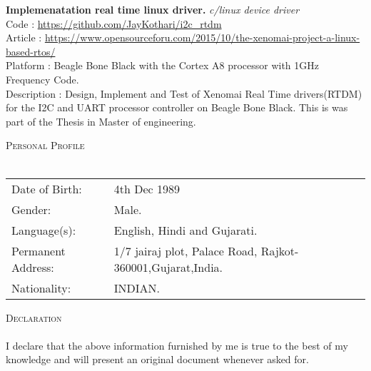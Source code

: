\documentclass[a4paper]{article}
\newcommand{\lineunder} {
    \vspace*{-8pt} \\
    \hspace*{-18pt} \hrulefill \\
}
\newcommand{\header} [1] {
    {\hspace*{-18pt}\vspace*{6pt} \textsc{#1}}
    \vspace*{-6pt} \lineunder
}
\begin{document}
{\textbf{Implemenatation real time linux driver.}} {\sl c/linux device driver} \hfill \\ 
Code : \url{https://github.com/JayKothari/i2c\_rtdm} \\ 
Article : \url{https://www.opensourceforu.com/2015/10/the-xenomai-project-a-linux-based-rtos/}\\
\vspace*{1mm}
Platform : Beagle Bone Black with the Cortex A8 processor with 1GHz Frequency Code.\\
Description : Design, Implement and Test of Xenomai Real Time drivers(RTDM) for the I2C and UART processor controller on Beagle Bone Black. This is was part of the Thesis in Master of engineering.\\
\vspace*{2mm}

\header{Personal Profile}
\begin{tabular}{ l l }
	Date of Birth:        & 4th Dec 1989                                  \\
	Gender:              & Male.                            				\\
	Language(s):           & English, Hindi and Gujarati. 					\\
	Permanent Address: & 1/7 jairaj plot, Palace Road, Rajkot-360001,Gujarat,India.     \\
	Nationality:            & INDIAN.                             			\\
\end{tabular}
\vspace*{2mm}

\header{Declaration}
I declare that the above information furnished by me is true to the best of my knowledge and will
present an original document whenever asked for.
\vspace*{2mm}

\ 
\end{document}
